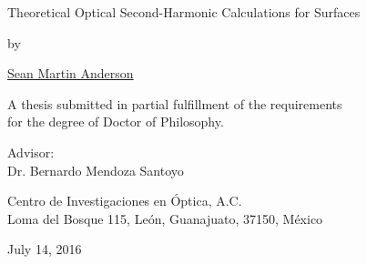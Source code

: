 \begin{titlingpage*}

\let\cleardoublepage\clearpage

\begin{center}

\vspace*{2cm}

{\Huge Theoretical Optical Second-Harmonic Calculations for Surfaces}
\vspace{1.0cm}

{\large by}
\vspace{1.0cm}

{\LARGE \href{mailto:sean.martin.anderson@gmail.com}{Sean Martin Anderson}}
\vspace{3cm}

{\Large A thesis submitted in partial fulfillment of the requirements\\
\vspace{0.25cm}
for the degree of Doctor of Philosophy.}
\vspace{4cm}

{\large Advisor:\\
Dr. Bernardo Mendoza Santoyo
\vspace*{1cm}

Centro de Investigaciones en \'Optica, A.C.\\
Loma del Bosque 115, Le\'on, Guanajuato, 37150, M\'exico}

\vfill

{July 14, 2016}

\end{center}

\end{titlingpage*}
